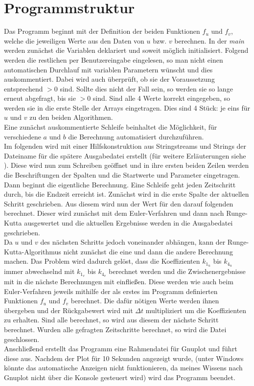 \documentclass[12pt,a4paper,titlepage,headinclude,bibtotoc]{scrartcl}
\begin{document}
\section{Programmstruktur}
Das Programm beginnt mit der Definition der beiden Funktionen $f_u$ und $f_v$, welche die jeweiligen Werte aus den Daten von $u$ bzw. $v$ berechnen.
In der \emph{main} werden zunächst die Variablen deklariert und soweit möglich initialisiert.
Folgend werden die restlichen per Benutzereingabe eingelesen, so man nicht einen automatischen Durchlauf mit variablen Parametern wünscht und dies auskommentiert.
Dabei wird auch überprüft, ob sie der Voraussetzung entsprechend $>0$ sind.
Sollte dies nicht der Fall sein, so werden sie so lange erneut abgefragt, bis sie $>0$ sind.
Sind alle 4 Werte korrekt eingegeben, so werden sie in die erste Stelle der Arrays eingetragen.
Dies sind 4 Stück: je eins für $u$ und $v$ zu den beiden Algorithmen.\\
Eine zunächst auskommentierte Schleife beinhaltet die Möglichkeit, für verschiedene $a$ und $b$ die Berechnung automatisiert durchzuführen.\\
Im folgenden wird mit einer Hilfskonstruktion aus Stringstreams und Strings der Dateiname für die spätere Ausgabedatei erstellt (für weitere Erläuterungen siehe \cite[S. 260]{youcanprogramm}).
Diese wird nun zum Schreiben geöffnet und in ihre ersten beiden Zeilen werden die Beschriftungen der Spalten und die Startwerte und Parameter eingetragen.\\
Dann beginnt die eigentliche Berechnung.
Eine Schleife geht jeden Zeitschritt durch, bis die Endzeit erreicht ist.
Zunächst wird in die erste Spalte der aktuellen Schritt geschrieben.
Aus diesem wird nun der Wert für den darauf folgenden berechnet.
Dieser wird zunächst mit dem Euler-Verfahren und dann nach Runge-Kutta ausgewertet und die aktuellen Ergebnisse werden in die Ausgabedatei geschrieben.\\
Da $u$ und $v$ des nächsten Schritts jedoch voneinander abhängen, kann der Runge-Kutta-Algorithmus nicht zunächst die eine und dann die andere Berechnung machen.
Das Problem wird dadurch gelöst, dass die Koeffizienten $k_{1_u}$ bis $k_{4_u}$ immer abwechselnd mit $k_{1_v}$ bis $k_{4_v}$ berechnet werden und die Zwischenergebnisse mit in die nächste Berechnungen mit einfließen.
Diese werden wie auch beim Euler-Verfahren jeweils mithilfe der als erstes im Programm definierten Funktionen $f_u$ und $f_v$ berechnet.
Die dafür nötigen Werte werden ihnen übergeben und der Rückgabewert wird mit $\Delta t$ multipliziert um die Koeffizienten zu erhalten.
Sind alle berechnet, so wird aus diesem der nächste Schritt berechnet.
Wurden alle gefragten Zeitschritte berechnet, so wird die Datei geschlossen.\\
Anschließend erstellt das Programm eine Rahmendatei für Gnuplot und führt diese aus.
Nachdem der Plot für 10 Sekunden angezeigt wurde, (unter Windows könnte das automatische Anzeigen nicht funktionieren, da meines Wissens nach Gnuplot nicht über die Konsole gesteuert wird) wird das Programm beendet.
\end{document}
